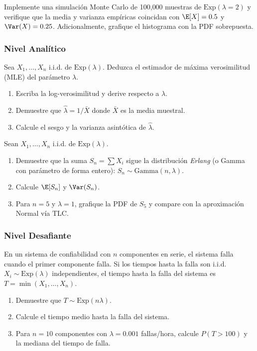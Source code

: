 \begin{problema}
	\label{prob:4.5.6}
	Implemente una simulación Monte Carlo de 100{,}000 muestras de $\text{Exp}(\lambda = 2)$ y verifique que la media y varianza empíricas coincidan con $\E[X] = 0.5$ y $\Var(X) = 0.25$. Adicionalmente, grafique el histograma con la PDF sobrepuesta.
\end{problema}

\subsubsection*{Nivel Analítico}

\begin{problema}
	\label{prob:4.5.7}
	Sea $X_{1}, \dots, X_{n}$ i.i.d. de $\text{Exp}(\lambda)$. Deduzca el estimador de máxima verosimilitud (MLE) del parámetro $\lambda$.
	\begin{enumerate}
		\item Escriba la log-verosimilitud y derive respecto a $\lambda$.
		\item Demuestre que $\hat{\lambda} = 1/\bar{X}$ donde $\bar{X}$ es la media muestral.
		\item Calcule el sesgo y la varianza asintótica de $\hat{\lambda}$.
	\end{enumerate}
\end{problema}

\begin{problema}
	\label{prob:4.5.8}
	Sean $X_{1}, \dots, X_{n}$ i.i.d. de $\text{Exp}(\lambda)$.
	\begin{enumerate}
		\item Demuestre que la suma $S_{n} = \sum X_{i}$ sigue la distribución \emph{Erlang} (o Gamma con parámetro de forma entero): $S_{n} \sim \text{Gamma}(n, \lambda)$.
		\item Calcule $\E[S_{n}]$ y $\Var(S_{n})$.
		\item Para $n = 5$ y $\lambda = 1$, grafique la PDF de $S_{5}$ y compare con la aproximación Normal vía TLC.
	\end{enumerate}
\end{problema}

\subsubsection*{Nivel Desafiante}

\begin{problema}
	\label{prob:4.5.9}
	En un sistema de confiabilidad con $n$ componentes en serie, el sistema falla cuando el primer componente falla. Si los tiempos hasta la falla son i.i.d. $X_{i} \sim \text{Exp}(\lambda)$ independientes, el tiempo hasta la falla del sistema es $T = \min(X_{1}, \dots, X_{n})$.
	\begin{enumerate}
		\item Demuestre que $T \sim \text{Exp}(n\lambda)$.
		\item Calcule el tiempo medio hasta la falla del sistema.
		\item Para $n = 10$ componentes con $\lambda = 0.001$ fallas/hora, calcule $P(T > 100)$ y la mediana del tiempo de falla.
	\end{enumerate}
\end{problema}

